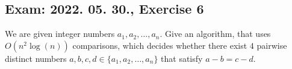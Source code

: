 \subsection{Exam: 2022. 05. 30., Exercise 6}


We are given integer numbers $a_1, a_2, \dots{}, a_n$. Give an algorithm, that
uses $O(n^2\log(n))$ comparisons, which decides whether there exist $4$ pairwise distinct numbers $a,b,c,d\in{}\{a_1,a_2,\dots{},a_n\}$ that satisfy $a-b=c-d$.



